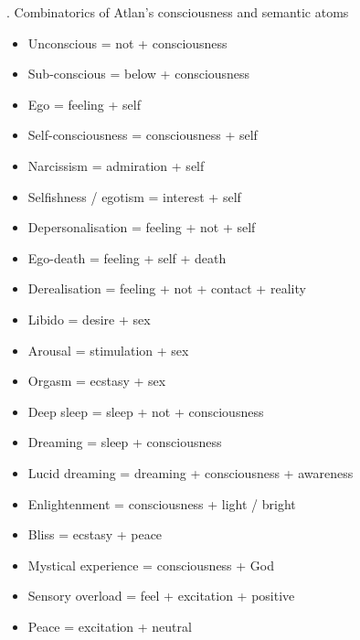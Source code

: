 . Combinatorics of Atlan’s consciousness and semantic atoms  
\begin{itemize}
\item   Unconscious = not + consciousness 

\item   Sub-conscious = below + consciousness 

\item   Ego = feeling + self 

\item   Self-consciousness = consciousness + self 

\item   Narcissism = admiration + self 

\item   Selfishness / egotism = interest + self 

\item   Depersonalisation = feeling + not + self 

\item   Ego-death = feeling + self + death 

\item   Derealisation = feeling + not + contact + reality  

\item   Libido = desire + sex 

\item   Arousal = stimulation + sex 

\item   Orgasm = ecstasy + sex 

\item   Deep sleep = sleep + not + consciousness 

\item   Dreaming = sleep + consciousness 

\item   Lucid dreaming = dreaming + consciousness + awareness 

\item   Enlightenment = consciousness + light / bright 

\item   Bliss = ecstasy + peace 

\item   Mystical experience = consciousness + God 

\item   Sensory overload = feel + excitation + positive 

\item   Peace = excitation + neutral 


\end{itemize}
